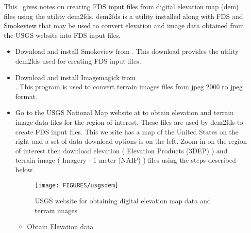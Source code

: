 
This \textchap\ gives notes on creating FDS input files from digital elevation map (dem) files using the utility dem2fds. 
dem2fds is a utility installed along with FDS and Smokeview that may be used to convert elevation and image data obtained 
from the USGS website  into FDS input files.


\begin{itemize}
\item Download and install Smokeview from .
This download provides the utility dem2fds used for creating FDS input files.

\item Download and install Imagemagick from \\  .
This program is used to convert terrain images files from jpeg 2000 to jpeg format.

\item Go to the USGS National Map website at  to obtain elevation and terrain image data files 
for the region of interest. 
These files are used by dem2fds to create FDS input files. 
This website has a map of the United States on the right and a set of data download options is on the left. 
Zoom in on the region of interest then download elevation ( Elevation Products (3DEP) ) and terrain image ( Imagery - 1 meter (NAIP) ) files using the steps described below.

\begin{figure}[bph]
\centerline{
\texttt{[image: FIGURES/usgsdem]}}
 \caption[FDS file overview]{USGS website for obtaining digital elevation map data and terrain images}
\label{usgswebsite}%
\end{figure}

\begin{itemize}
\item Obtain Elevation data


\end{itemize}
\end{itemize}
